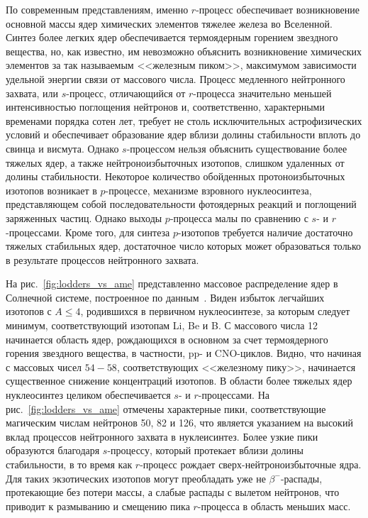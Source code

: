 По современным представлениям, именно $r$-процесс обеспечивает возникновение основной массы ядер химических элементов тяжелее железа во Вселенной. Синтез более легких ядер обеспечивается термоядерным горением звездного вещества, но, как известно, им невозможно объяснить возникновение химических элементов за так называемым <<железным пиком>>, максимумом зависимости удельной энергии связи от массового числа. Процесс медленного нейтронного захвата, или $s$-процесс, отличающийся от $r$-процесса значительно меньшей интенсивностью поглощения нейтронов и, соответственно, характерными временами порядка сотен лет, требует не столь исключительных астрофизических условий и обеспечивает образование ядер вблизи долины стабильности вплоть до свинца и висмута. Однако $s$-процессом нельзя объяснить существование более тяжелых ядер, а также нейтроноизбыточных изотопов, слишком удаленных от долины стабильности. Некоторое количество обойденных протоноизбыточных изотопов возникает в $p$-процессе, механизме взровного нуклеосинтеза, представляющем собой последовательности фотоядерных реакций и поглощений заряженных частиц. Однако выходы $p$-процесса малы по сравнению с $s$- и $r$-процессами. Кроме того, для синтеза $p$-изотопов требуется наличие достаточно тяжелых стабильных ядер, достаточное число которых может образоваться только в результате процессов нейтронного захвата. 

На рис.~\ref{fig:lodders_vs_ame} представленно массовое распределение ядер в Солнечной системе, построенное по данным~\cite{lodders2003}. Виден избыток легчайших изотопов с $A \leq 4$, родившихся в первичном нуклеосинтезе, за которым следует минимум, соответствующий изотопам Li, Be и B. С массового числа 12 начинается область ядер, рождающихся в основном за счет термоядерного горения звездного вещества, в частности, pp- и CNO-циклов. Видно, что начиная с массовых чисел $54 - 58$, соответствующих <<железному пику>>, начинается существенное снижение концентраций изотопов. В области более тяжелых ядер нуклеосинтез целиком обеспечивается $s$- и $r$-процессами. На рис.~\ref{fig:lodders_vs_ame} отмечены характерные пики, соответствующие магическим числам нейтронов 50, 82 и 126, что является указанием на высокий вклад процессов нейтронного захвата в нуклеисинтез. Более узкие пики образуются благодаря $s$-процессу, который протекает вблизи долины стабильности, в то время как $r$-процесс рождает сверх-нейтроноизбыточные ядра. Для таких экзотических изотопов могут преобладать уже не $\beta^-$-распады, протекающие без потери массы, а слабые распады с вылетом нейтронов, что приводит к размыванию и смещению пика $r$-процесса в область меньших масс.

